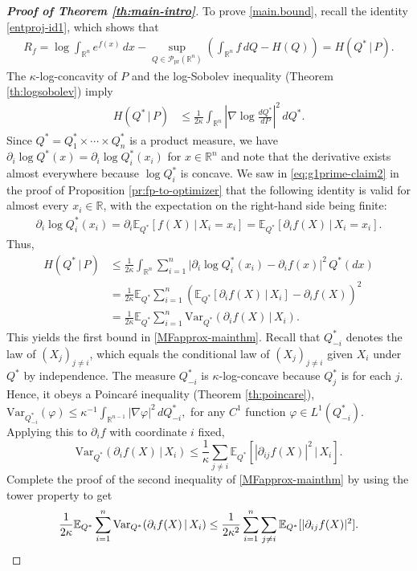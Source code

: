 \documentclass[11pt,reqno]{amsart}
\numberwithin{equation}{section}
\theoremstyle{definition}
\def\E{{\mathbb E}}
\def\R{{\mathbb R}}
\def\P{{\mathcal P}}
\def\Var{{\mathrm{Var}}}
\def\Pprod{\P_{\mathrm{pr}}}
\begin{document}
\begin{proof}[\textbf{Proof of Theorem \ref{th:main-intro}}]
	To prove \eqref{main.bound}, recall the identity \eqref{entproj-id1}, which shows that 
	\begin{align*}
		R_f = \log \int_{\R^n} e^{f(x)}\,dx - \sup_{Q \in \Pprod(\R^n)}\left(\int_{\R^n} f\,dQ - H(Q)\right) = H(Q^*\,|\,P).
	\end{align*}
	The $\kappa$-log-concavity of $P$ and the log-Sobolev inequality (Theorem \ref{th:logsobolev}) imply
	\begin{align*}
		H(Q^*\,|\,P) &\le \frac{1}{2\kappa}\int_{\R^n}\left|\nabla \log \frac{dQ^*}{dP}\right|^2\,dQ^*. 
	\end{align*}
	Since $Q^*=Q^*_1\times \cdots \times Q^*_n$ is a product measure, we have $\partial_i \log Q^*(x) = \partial_i\log Q^*_i(x_i)$ for $x \in \R^n$  and note that the derivative exists almost everywhere because $\log Q^*_i$ is concave. We saw in \eqref{eq:g1prime-claim2} in the proof of Proposition \ref{pr:fp-to-optimizer} that the following identity is valid  for almost every $x_i \in \R$, with the expectation on the right-hand side being finite:
	\begin{align*}
		\partial_i\log Q^*_i(x_i) = \partial_i\E_{Q^*}[ f(X)\,|\,X_i=x_i] = \E_{Q^*}[\partial_i f(X)\,|\,X_i=x_i].
	\end{align*}
	Thus,
	\begin{align*}
		H(Q^*\,|\,P) &\le \frac{1}{2\kappa} \int_{\R^n} \sum_{i=1}^n \Big| \partial_i \log Q^*_i(x_i) - \partial_i f(x)\Big|^2\,Q^*(dx) \\
		&= \frac{1}{2\kappa} \E_{Q^*}\sum_{i=1}^n \left(\E_{Q^*}[\partial_i f(X)\,|\,X_i] - \partial_if(X)\right)^2  \\
		&= \frac{1}{2\kappa}\E_{Q^*}\sum_{i=1}^n \Var_{Q^*}(\partial_i f(X)\,|\,X_i).
	\end{align*}
This yields the first bound in \eqref{MFapprox-mainthm}.
	Recall that $Q^*_{-i}$ denotes the law of $(X_j)_{j \neq i}$, which equals the conditional law of $(X_j)_{j \neq i}$ given $X_i$ under $Q^*$ by independence. The measure $Q^*_{-i}$ is $\kappa$-log-concave because $Q^*_j$ is for each $j$. Hence, it obeys a Poincar\'e inequality (Theorem \ref{th:poincare}), $\Var_{Q^*_{-i}}(\varphi) \le \kappa^{-1} \int_{\R^{n-1}} |\nabla \varphi|^2 \, dQ^*_{-i},$ for any $C^1$ function $\varphi \in L^1(Q^*_{-i})$. Applying this to $\partial_if$ with coordinate $i$ fixed, 
	\begin{equation*}
		\Var_{Q^*}(\partial_i f(X)\,|\,X_i) \le \frac{1}{\kappa}\sum_{j \neq i}\E_{Q^*}[|\partial_{ij}f(X)|^2\,|\,X_i]. 
	\end{equation*}
Complete the proof of the second inequality of \eqref{MFapprox-mainthm} by using the tower property to get
	\begin{equation*}
		\frac{1}{2\kappa}\E_{Q^*}\sum_{i=1}^n\Var_{Q^*}(\partial_i f(X)\,|\,X_i) \le \frac{1}{2\kappa^2}  \sum_{i=1}^n\sum_{j \neq i}\E_{Q^*}[|\partial_{ij}f(X)|^2] . \qedhere
	\end{equation*}
\end{proof}
\end{document}
